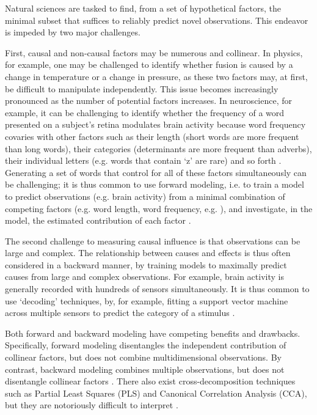 Natural sciences are tasked to find, from a set of hypothetical factors, the minimal subset that suffices to reliably predict novel observations. This endeavor is impeded by two major challenges.

First, causal and non-causal factors may be numerous and collinear. In physics, for example, one may be challenged to identify whether fusion is caused by a change in temperature or a change in pressure, as these two factors may, at first, be difficult to manipulate independently. This issue becomes increasingly pronounced as the number of potential factors increases. In neuroscience, for example, it can be challenging to identify whether the frequency of a word presented on a subject's retina modulates brain activity because word frequency covaries with other factors such as their length (short words are more frequent than long words), their categories (determinants are more frequent than adverbs), their individual letters (e.g. words that contain `z' are rare) and so forth \citep{kutas2011thirty,pegado2014timing}. Generating a set of words that control for all of these factors simultaneously can be challenging; it is thus common to use forward modeling, i.e. to train a model to predict observations (e.g. brain activity) from a minimal combination of competing factors (e.g. word length, word frequency, e.g. \citep{huth2016natural}), and investigate, in the model, the estimated contribution of each factor \citep{friston1994statistical}.

The second challenge to measuring causal influence is that observations can be large and complex. The relationship between causes and effects is thus often considered in a backward manner, by training models to maximally predict causes from large and complex observations. For example, brain activity is generally recorded with hundreds of sensors simultaneously. It is thus common to use `decoding' techniques, by, for example, fitting a support vector machine across multiple sensors to predict the category of a stimulus \citep{cichy2014resolving, king2016brain, kriegeskorte2008representational, norman2006beyond}.

Both forward and backward modeling have competing benefits and drawbacks. Specifically, forward modeling disentangles the independent contribution of collinear factors, but does not combine multidimensional observations. By contrast, backward modeling combines multiple observations, but does not disentangle collinear factors \cite{weichwald2015causal, hebart2018deconstructing, king2018encoding}. There also exist cross-decomposition techniques such as Partial Least Squares (PLS) and Canonical Correlation Analysis (CCA), but they are notoriously difficult to interpret \citep{lebart1995statistique}.

